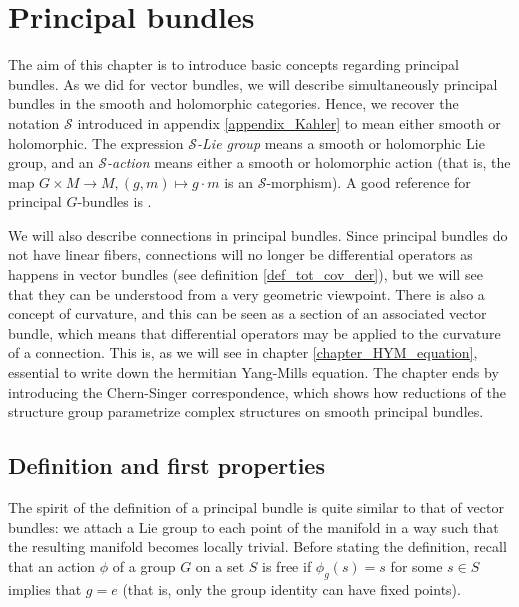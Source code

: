 \chapter{Principal bundles} \label{chapter_principal_bundles}
The aim of this chapter is to introduce basic concepts regarding principal bundles. As we did for vector bundles, we will describe simultaneously principal bundles in the smooth and holomorphic categories. Hence, we recover the notation \(\mathcal{S}\) introduced in appendix \ref{appendix_Kahler} to mean either smooth or holomorphic. The expression \(\mathcal{S}\)\textit{-Lie group} means a smooth or holomorphic Lie group, and an \(\mathcal{S}\)\textit{-action} means either a smooth or holomorphic action (that is, the map \(G \times M \to M, (g,m)\mapsto g \cdot m\) is an \(\mathcal{S}\)-morphism). A good reference for principal \(G\)-bundles is \parencite[Ch. 1]{Rudolph_2017pug}. 

We will also describe connections in principal bundles. Since principal bundles do not have linear fibers, connections will no longer be differential operators as happens in vector bundles (see definition \ref{def_tot_cov_der}), but we will see that they can be understood from a very geometric viewpoint. There is also a concept of curvature, and this can be seen as a section of an associated vector bundle, which means that differential operators may be applied to the curvature of a connection. This is, as we will see in chapter \ref{chapter_HYM_equation}, essential to write down the hermitian Yang-Mills equation. The chapter ends by introducing the Chern-Singer correspondence, which shows how reductions of the structure group parametrize complex structures on smooth principal bundles. 

\section{Definition and first properties}
The spirit of the definition of a principal bundle is quite similar to that of vector bundles: we attach a Lie group to each point of the manifold in a way such that the resulting manifold becomes locally trivial. Before stating the definition, recall that an action \(\phi\) of a group \(G\) on a set \(S\) is free if \(\phi_g(s)=s\) for some \(s \in S\) implies that \(g=e\) (that is, only the group identity can have fixed points).

